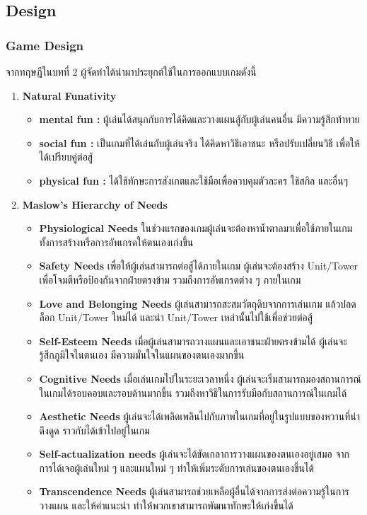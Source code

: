 \documentclass[12pt,oneside,openright,a4paper]{cpe-thai-project}
\begin{document}
\subsection{Design}

\subsubsection{Game Design}
จากทฤษฎีในบทที่ 2 ผู้จัดทำได้นำมาประยุกต์ใช้ในการออกแบบเกมดังนี้

\begin{enumerate}
  \item \textbf{Natural Funativity}
  \begin{itemize}
    \item \textbf{mental fun :} ผู้เล่นได้สนุกกับการได้คิดและวางแผนสู้กับผู้เล่นคนอื่น มีความรู้สึกท้าทาย
    \item \textbf{social fun :} เป็นเกมที่ได้เล่นกับผู้เล่นจริง ได้คิดหาวิธีเอาชนะ หรือปรับเปลี่ยนวิธี
    เพื่อให้ได้เปรียบคู่ต่อสู้
    \item \textbf{physical fun :} ได้ใช้ทักษะการสังเกตและใช้มือเพื่อควบคุมตัวละคร ใช้สกิล และอื่นๆ
  \end{itemize}

  \item \textbf{Maslow’s Hierarchy of Needs}
  \begin{itemize}
    \item \textbf{Physiological Needs} ในช่วงแรกของเกมผู้เล่นจะต้องหาน้ำตาลมาเพื่อใช้ภายในเกม 
      ทั้งการสร้างหรือการอัพเกรดให้ตนเองเก่งขึ้น	
    \item \textbf{Safety Needs} เพื่อให้ผู้เล่นสามารถต่อสู้ได้ภายในเกม ผู้เล่นจะต้องสร้าง Unit/Tower 
      เพื่อโจมตีหรือป้องกันจากฝ่ายตรงข้าม รวมถึงการอัพเกรดต่าง ๆ ภายในเกม
    \item \textbf{Love and Belonging Needs} ผู้เล่นสามารถสะสมวัตถุดิบจากการเล่นเกม 
      แล้วปลดล็อก Unit/Tower ใหม่ได้ และนำ Unit/Tower เหล่านั้นไปใช้เพื่อช่วยต่อสู้
    \item \textbf{Self-Esteem Needs} เมื่อผู้เล่นสามารถวางแผนและเอาชนะฝ่ายตรงข้ามได้ 
      ผู้เล่นจะรู้สึกภูมิใจในตนเอง มีความมั่นใจในแผนของตนเองมากขึ้น
    \item \textbf{Cognitive Needs} เมื่อเล่นเกมไปในระยะเวลาหนึ่ง 
      ผู้เล่นจะเริ่มสามารถมองสถานการณ์ในเกมได้รอบคอบและรอบด้านมากขึ้น 
      รวมถึงหาวิธีในการรับมือกับสถานการณ์ในเกมได้
    \item \textbf{Aesthetic Needs} ผู้เล่นจะได้เพลิดเพลินไปกับภาพในเกมที่อยู่ในรูปแบบของหวานที่น่าดึงดูด 
      ราวกับได้เข้าไปอยู่ในเกม
    \item \textbf{Self-actualization needs} ผู้เล่นจะได้ขัดเกลาการวางแผนของตนเองอยู่เสมอ 
      จากการได้เจอผู้เล่นใหม่ ๆ และแผนใหม่ ๆ ทำให้เพิ่มระดับการเล่นของตนเองขึ้นได้
    \item \textbf{Transcendence Needs} ผู้เล่นสามารถช่วยเหลือผู้อื่นได้จากการส่งต่อความรู้ในการวางแผน
      และให้คำแนะนำ ทำให้พวกเขาสามารถพัฒนาทักษะให้เก่งขึ้นได้
  \end{itemize}


\end{enumerate}
\end{document}
